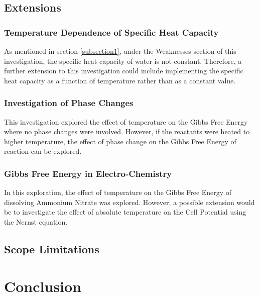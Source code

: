 \documentclass{article}
\begin{document}
\subsection{Extensions}
\subsubsection{Temperature Dependence of Specific Heat Capacity}
As mentioned in section \ref{subsection1}, under the Weaknesses section of this investigation, the specific heat capacity of water is not constant. Therefore, a further extension to this investigation could include implementing the specific heat capacity as a function of temperature rather than as a constant value.

\subsubsection{Investigation of Phase Changes}
This investigation explored the effect of temperature on the Gibbs Free Energy where no phase changes were involved. However, if the reactants were heated to higher temperature, the effect of phase change on the Gibbs Free Energy of reaction can be explored.

\subsubsection{Gibbs Free Energy in Electro-Chemistry}
In this exploration, the effect of temperature on the Gibbs Free Energy of dissolving Ammonium Nitrate was explored. However, a possible extension would be to investigate the effect of absolute temperature on the Cell Potential using the Nernst equation.

\subsection{Scope Limitations}


\section{Conclusion}
\end{document}
